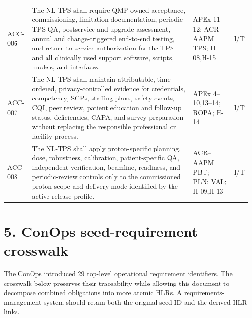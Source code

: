 \documentclass[11pt,letterpaper]{article}
\begin{document}
\begin{small}
\begin{longtable}{@{}L{0.0806\textwidth}L{0.5386\textwidth}L{0.1868\textwidth}L{0.1140\textwidth}@{}}
\addlinespace[2pt]
ACC-006 & The NL-TPS shall require QMP-owned acceptance, commissioning, limitation documentation, periodic TPS QA, postservice and upgrade assessment, annual and change-triggered end-to-end testing, and return-to-service authorization for the TPS and all clinically used support software, scripts, models, and interfaces. & APEx 11--12; ACR--AAPM TPS; H-08,H-15 & I\slash\allowbreak{}T \\
\addlinespace[2pt]
ACC-007 & The NL-TPS shall maintain attributable, time-ordered, privacy-controlled evidence for credentials, competency, SOPs, staffing plans, safety events, CQI, peer review, patient education and follow-up status, deficiencies, CAPA, and survey preparation without replacing the responsible professional or facility process. & APEx 4--10,13--14; ROPA; H-14 & I\slash\allowbreak{}T \\
\addlinespace[2pt]
ACC-008 & The NL-TPS shall apply proton-specific planning, dose, robustness, calibration, patient-specific QA, independent verification, beamline, readiness, and periodic-review controls only to the commissioned proton scope and delivery mode identified by the active release profile. & ACR--AAPM PBT; PLN; VAL; H-09,H-13 & I\slash\allowbreak{}T \\
\end{longtable}
\end{small}

\section{5. ConOps seed-requirement crosswalk}

The ConOps introduced 29 top-level operational requirement identifiers. The crosswalk below preserves their traceability while allowing this document to decompose combined obligations into more atomic HLRs. A requirements-management system should retain both the original seed ID and the derived HLR links.
\end{document}
